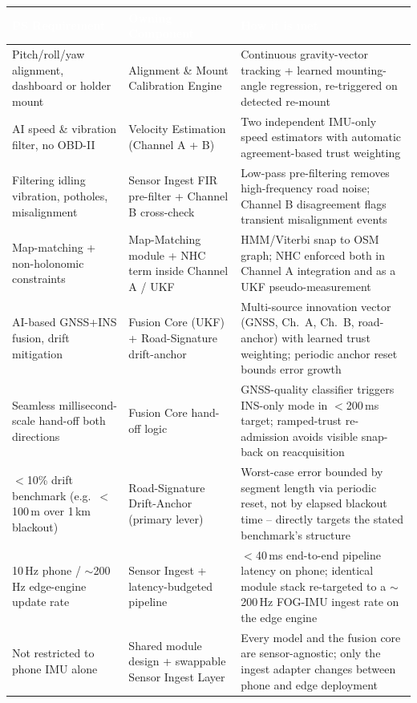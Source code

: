 \documentclass[10.5pt]{article}
\begin{document}
\begin{longtable}{@{}p{5.7cm}p{4.1cm}p{5.6cm}@{}}
\toprule
\rowcolor{tablehead}
\textcolor{white}{\textbf{PS Requirement}} & \textcolor{white}{\textbf{Owning Component}} & \textcolor{white}{\textbf{How it is met}} \\
\midrule
\endhead
Pitch/roll/yaw alignment, dashboard or holder mount & Alignment \& Mount Calibration Engine & Continuous gravity-vector tracking + learned mounting-angle regression, re-triggered on detected re-mount \\
AI speed \& vibration filter, no OBD-II & Velocity Estimation (Channel A + B) & Two independent IMU-only speed estimators with automatic agreement-based trust weighting \\
Filtering idling vibration, potholes, misalignment & Sensor Ingest FIR pre-filter + Channel B cross-check & Low-pass pre-filtering removes high-frequency road noise; Channel B disagreement flags transient misalignment events \\
Map-matching + non-holonomic constraints & Map-Matching module + NHC term inside Channel A / UKF & HMM/Viterbi snap to OSM graph; NHC enforced both in Channel A integration and as a UKF pseudo-measurement \\
AI-based GNSS+INS fusion, drift mitigation & Fusion Core (UKF) + Road-Signature drift-anchor & Multi-source innovation vector (GNSS, Ch.\ A, Ch.\ B, road-anchor) with learned trust weighting; periodic anchor reset bounds error growth \\
Seamless millisecond-scale hand-off both directions & Fusion Core hand-off logic & GNSS-quality classifier triggers INS-only mode in $<$200\,ms target; ramped-trust re-admission avoids visible snap-back on reacquisition \\
$<$10\% drift benchmark (e.g.\ $<$100\,m over 1\,km blackout) & Road-Signature Drift-Anchor (primary lever) & Worst-case error bounded by segment length via periodic reset, not by elapsed blackout time -- directly targets the stated benchmark's structure \\
10\,Hz phone / $\sim$200\,Hz edge-engine update rate & Sensor Ingest + latency-budgeted pipeline & $<$40\,ms end-to-end pipeline latency on phone; identical module stack re-targeted to a $\sim$200\,Hz FOG-IMU ingest rate on the edge engine \\
Not restricted to phone IMU alone & Shared module design + swappable Sensor Ingest Layer & Every model and the fusion core are sensor-agnostic; only the ingest adapter changes between phone and edge deployment \\
\bottomrule
\end{longtable}
\end{document}
